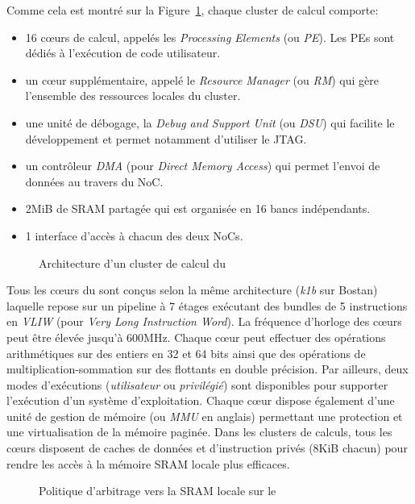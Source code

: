 \documentclass[main.tex]{subfiles}
\begin{document}
Comme cela est montré sur la Figure~\ref{fig_resumeFr_MPPAComputeCluster}, chaque cluster de calcul comporte:
\begin{itemize}
    \item 16 c\oe{}urs de calcul, appelés les \emph{Processing Elements} (ou \emph{PE}). Les PEs sont dédiés à l'exécution de code utilisateur.
    \item un c\oe{}ur supplémentaire, appelé le \emph{Resource Manager} (ou \emph{RM}) qui gère l'ensemble des ressources locales du cluster.
    \item une unité de débogage, la \emph{Debug and Support Unit} (ou \emph{DSU}) qui facilite le développement et permet notamment d'utiliser le JTAG.
    \item un contrôleur \emph{DMA} (pour \emph{Direct Memory Access}) qui permet l'envoi de données au travers du NoC.
    \item 2MiB de SRAM partagée qui est organisée en 16 bancs indépendants.
    \item 1 interface d'accès à chacun des deux NoCs.
\end{itemize}
\begin{figure}
    \centering
    \scalebox{0.8}{}
    \caption{Architecture d'un cluster de calcul du \mppalong}
    \label{fig_resumeFr_MPPAComputeCluster}
\end{figure}

Tous les c\oe{}urs du \mppalong sont conçus selon la même architecture (\emph{k1b} sur Bostan) laquelle repose sur un pipeline à 7 étages exécutant des bundles de 5 instructions en \emph{VLIW} (pour \emph{Very Long Instruction Word}). La fréquence d'horloge des c\oe{}urs peut être élevée jusqu'à 600MHz. Chaque c\oe{}ur peut effectuer des opérations arithmétiques sur des entiers en 32 et 64 bits ainsi que des opérations de multiplication-sommation sur des flottants en double précision. Par ailleurs, deux modes d'exécutions (\emph{utilisateur} ou \emph{privilégié}) sont disponibles pour supporter l'exécution d'un système d'exploitation. Chaque c\oe{}ur dispose également d'une unité de gestion de mémoire (ou \emph{MMU} en anglais) permettant une protection et une virtualisation de la mémoire paginée. Dans les clusters de calculs, tous les c\oe{}urs disposent de caches de données et d'instruction privés (8KiB chacun) pour rendre les accès à la mémoire SRAM locale plus efficaces.

\begin{figure}
    \centering
    \scalebox{0.8}{}
    \caption{Politique d'arbitrage vers la SRAM locale sur le \mppalong}
    \label{fig_resumeFr_MPPASMEMarbiter}
\end{figure}
\end{document}
